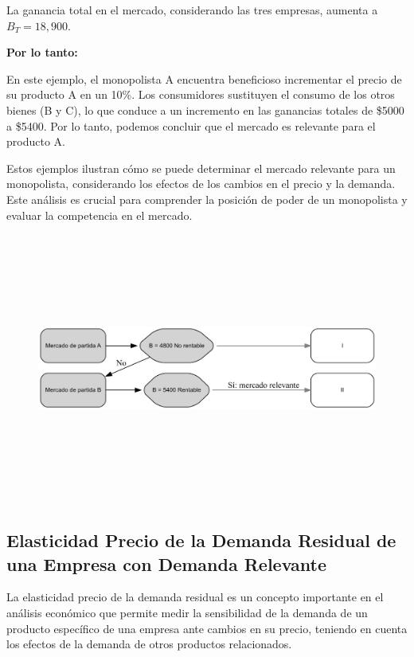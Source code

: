 \documentclass[
  a4paper,
]{article}
\begin{document}
La ganancia total en el mercado, considerando las tres empresas, aumenta
a \(B_T = 18,900\).

\textbf{Por lo tanto:}

En este ejemplo, el monopolista A encuentra beneficioso incrementar el
precio de su producto A en un 10\%. Los consumidores sustituyen el
consumo de los otros bienes (B y C), lo que conduce a un incremento en
las ganancias totales de \$5000 a \$5400. Por lo tanto, podemos concluir
que el mercado es relevante para el producto A.

Estos ejemplos ilustran cómo se puede determinar el mercado relevante
para un monopolista, considerando los efectos de los cambios en el
precio y la demanda. Este análisis es crucial para comprender la
posición de poder de un monopolista y evaluar la competencia en el
mercado.

\begin{figure}[H]

{\centering \includegraphics[width=5.5in,height=3.5in]{index_files/figure-latex/dot-figure-2.png}

}

\end{figure}

\hypertarget{elasticidad-precio-de-la-demanda-residual-de-una-empresa-con-demanda-relevante}{%
\subsection{Elasticidad Precio de la Demanda Residual de una Empresa con
Demanda
Relevante}\label{elasticidad-precio-de-la-demanda-residual-de-una-empresa-con-demanda-relevante}}

La elasticidad precio de la demanda residual es un concepto importante
en el análisis económico que permite medir la sensibilidad de la demanda
de un producto específico de una empresa ante cambios en su precio,
teniendo en cuenta los efectos de la demanda de otros productos
relacionados.
\end{document}
